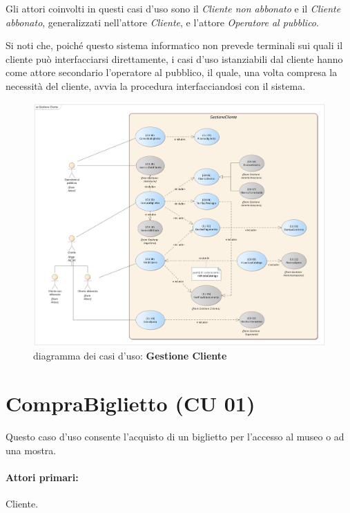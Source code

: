 \documentclass{article}
\begin{document}
\medskip
Gli attori coinvolti in questi casi d'uso sono il \emph{Cliente non abbonato} e il \emph{Cliente abbonato}, generalizzati nell'attore \emph{Cliente}, e l'attore \emph{Operatore al pubblico}.

\medskip
Si noti che, poiché questo sistema informatico non prevede terminali sui quali il cliente può interfacciarsi direttamente, i casi d'uso istanziabili dal cliente hanno come attore secondario l'operatore al pubblico, il quale, una volta compresa la necessità del cliente, avvia la procedura interfacciandosi con il sistema.

\begin{figure}[h]
    \centering
    \includegraphics[width=1\textwidth]{Gestione Cliente}
    \caption{diagramma dei casi d'uso: \textbf{Gestione Cliente}}
    \label{fig:GestioneCliente}
\end{figure}

	

	\section*{CompraBiglietto (CU 01)}
	
	\indent\indent Questo caso d'uso consente l'acquisto di un biglietto per l'accesso al museo o ad una mostra.
	
	\paragraph{Attori primari:}Cliente.
	
\end{document}
